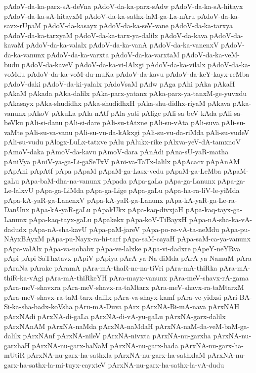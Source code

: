 {pAdoV-da-ka-parx-sA-deVna
pAdoV-da-ka-parx-sAdw
pAdoV-da-ka-sA-hitayx
pAdoV-da-ka-sA-hitayxM
pAdoV-da-ka-sathx-laM-ga-La-nAru
pAdoV-da-ka-savx-rUpaM
pAdoV-da-kasayx
pAdoV-da-ka-seV-vane
pAdoV-da-ka-tarxya
pAdoV-da-ka-tarxyaM
pAdoV-da-ka-tarx-ya-dalilx
pAdoV-da-kava
pAdoV-da-kavaM
pAdoV-da-ka-valalx
pAdoV-da-ka-vanA
pAdoV-da-ka-vanenxV
pAdoV-da-ka-vanunx
pAdoV-da-ka-varxta
pAdoV-da-ka-varxtaM
pAdoV-da-ka-veM-budu
pAdoV-da-kaveV
pAdoV-da-ka-vi-lAlxgi
pAdoV-da-ka-vilalx
pAdoV-da-ka-voMdu
pAdoV-da-ka-voM-du-muKa
pAdoV-da-kavu
pAdoV-da-keY-kayx-reMba
pAdoV-daki
pAdoV-da-ki-yalalx
pAdoVsaM
pAdw
pAga
pAhi
pAka
pAkaH
pAkaM
pAkada
pAka-dalilx
pAka-parx-yatanx
pAka-parx-ya-tanxM-ge-yuvxdu
pAkasayx
pAka-shudidhx
pAka-shudidhxH
pAka-shu-didhx-riyaM
pAkava
pAka-vanunx
pAkoV
pAkuLa
pAla-nAtf
pAla-yati
pAlige
pAli-sa-beV-kAda
pAli-sa-beVku
pAli-si-danu
pAli-si-dare
pAli-su-tAtxne
pAli-su-vAta
pAli-suva
pAli-su-vaMte
pAli-su-va-vanu
pAli-su-vu-da-kAkxgi
pAli-su-vu-da-riMda
pAli-su-vudeV
pAli-su-vudu
pAlogx-LuLx-tatxve
pAlu
pAlukx-rike
pAlxva-yeV-dA-tamxnoV
pAmoV-daka
pAmoV-da-kavu
pAmoV-dara
pAnAdi
pAna-sU-yaR-matha
pAniVya
pAniV-ya-ga-Li-gaSeTxV
pAni-va-TaTx-lalilx
pApAcacx
pApAnAM
pApAni
pApAtf
pApa
pApaM
pApaM-ga-Lasx-vedu
pApaM-ga-LeMba
pApaM-gaLu
pApa-baM-dha-na-vanunx
pApada
pApa-gaLa
pApa-ga-Lanunx
pApa-ga-Le-lalxvU
pApa-ga-LiMda
pApa-ga-Lige
pApa-gaLu
pApa-ha-ra-liV-le-yiMda
pApa-kA-yaR-ga-LanenxV
pApa-kA-yaR-ga-Lanunx
pApa-kA-yaR-ga-Le-ra-DanUnx
pApa-kA-yaR-gaLu
pApakUkx
pApa-kaq-divxjaH
pApa-kaq-tayx-ga-Lanunx
pApa-kaq-tayx-gaLu
pApakekx
pApa-koV-TiBayxH
pApa-nA-sha-ka-vA-dadudx
pApa-nA-sha-kavU
pApa-paM-jareV
pApa-po-re-vA-ta-neMdu
pApa-pu-NAyxBAyxM
pApa-pu-Nayx-ra-hi-tarf
pApa-saM-cayaH
pApa-saM-ca-ya-vanunx
pApa-valAlx
pApa-va-nobabx
pApa-ve-lalxke
pApa-vi-dadxre
pApeY-neYRva
pApi
pApi-SaThxtavx
pApiV
pApiya
pArA-ya-Na-diMda
pArA-ya-NamuM
pAra
pAraNa
pArake
pAramA
pAra-mA-thaR-ne-na-tiVri
pAra-mA-thiRka
pAra-mA-thiR-ka-vAgi
pAra-mA-thiRkeYH
pAra-mayx-vanunx
pAra-meV-shavx-rA-gama
pAra-meV-shavxra
pAra-meV-shavx-ra-taMtarx
pAra-meV-shavx-ra-taMtarxM
pAra-meV-shavx-ra-taM-tarx-dalilx
pAra-va-shayx-kamf
pAra-ve-yidxsi
pAri-BA-Si-ka-sha-badx-koVsha
pAru-mA-Duva
pArx
pArxNA-Bi-mA-nava
pArxNAH
pArxNAdi
pArxNA-di-gaLa
pArxNA-di-vA-yu-gaLu
pArxNA-garx-dalilx
pArxNAnAM
pArxNA-naMda
pArxNA-naMdaH
pArxNA-naM-da-veM-baM-ga-dalilx
pArxNAnf
pArxNA-nileV
pArxNA-nivxta
pArxNA-nu-garxha
pArxNA-nu-garxhaH
pArxNA-nu-garx-haNaM
pArxNA-nu-garx-hada
pArxNA-nu-garx-ha-mUtiR
pArxNA-nu-garx-ha-sathxla
pArxNA-nu-garx-ha-sathxlaM
pArxNA-nu-garx-ha-sathx-la-mi-tuyx-cayxteV
pArxNA-nu-garx-ha-sathx-la-vA-dudu
}
